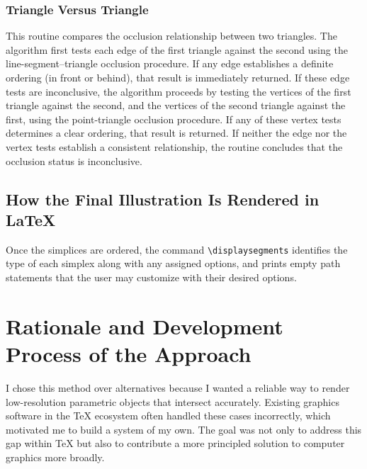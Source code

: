 \subsubsection{Triangle Versus Triangle}

This routine compares the occlusion relationship between two triangles. 
The algorithm first tests each edge of the first triangle against the 
second using the line-segment--triangle occlusion procedure. If any edge 
establishes a definite ordering (in front or behind), that result is 
immediately returned. If these edge tests are inconclusive, the 
algorithm proceeds by testing the vertices of the first triangle against 
the second, and the vertices of the second triangle against the first, 
using the point-triangle occlusion procedure. If any of these vertex 
tests determines a clear ordering, that result is returned. If neither 
the edge nor the vertex tests establish a consistent relationship, the 
routine concludes that the occlusion status is inconclusive.

\subsection{How the Final Illustration Is Rendered in LaTeX}

Once the simplices are ordered, the command \verb|\displaysegments| 
identifies the type of each simplex along with any assigned options, 
and prints empty path statements that the user may customize with 
their desired options.

\section{Rationale and Development Process of the Approach}

I chose this method over alternatives because I wanted a reliable way 
to render low-resolution parametric objects that intersect accurately. 
Existing graphics software in the \TeX{} ecosystem often handled these 
cases incorrectly, which motivated me to build a system of my own. The 
goal was not only to address this gap within \TeX{} but also to 
contribute a more principled solution to computer graphics more 
broadly.


